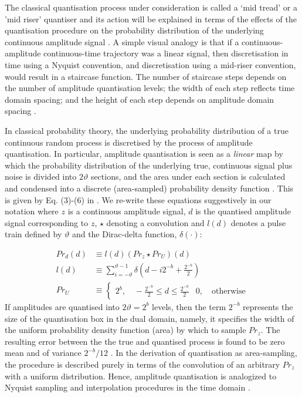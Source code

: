 The classical quantisation process under consideration is called a `mid tread' or a 'mid riser' quantiser and its action will be explained in terms of the effects of the quantisation procedure on the probability distribution of the underlying continuous amplitude signal \cite{widrow1996,karlsson2005}. A simple visual analogy is that if a continuous-amplitude continuous-time trajectory was a linear signal, then discretisation in time using a Nyquist convention, and discretisation using a mid-riser convention, would result in a staircase function. The number of staircase steps depends on the number of amplitude quantisation levels; the width of each step reflects time domain spacing; and the height of each step depends on amplitude domain spacing \cite{karlsson2005}.

In classical probability theory, the underlying probability distribution of a true continuous random process is discretised by the process of amplitude quantisation. In particular, amplitude quantisation is seen as a \emph{linear} map by which the probability distribution of the underlying true, continuous signal plus noise is divided into $2\vartheta$ sections, and the area under each section is calculated and condensed into a discrete (area-sampled) probability density function \cite{widrow1996,karlsson2005}.  This is given by Eq. (3)-(6) in \cite{karlsson2005}. We re-write these equations suggestively in our notation where $z$ is a continuous amplitude signal, $d$ is the quantised amplitude signal corresponding to $z$, $\star$ denoting a convolution and $l(d)$ denotes a pulse train defined by $\vartheta$ and the Dirac-delta function, $\delta(\cdot)$:

\begin{align}
Pr_d(d) & \equiv l(d) (Pr_z \star Pr_U)(d)  \label{eqn:app:classical_amp_quan_1}\\
l(d) & \equiv \sum_{i = -\vartheta}^{\vartheta-1} \delta (d - i2^{-b} +  \frac{2^{-b}}{2} ) \\
Pr_U & \equiv \begin{cases} 2^b, \quad -\frac{2^{-b}}{2} \leq d \leq  \frac{2^{-b}}{2} & 0, \quad \text{otherwise} \end{cases}
\end{align}
If amplitudes are quantised into $2\vartheta= 2^b$ levels, then the term $2^{-b}$ represents the size of the quantisation box in the dual domain, namely, it specifies the width of the uniform probability density function (area) by which to sample $Pr_z$.  The resulting error between the the true and quantised process is found to be zero mean and of variance $2^{-b} / 12$ \cite{widrow1996}. In the derivation of quantisation as area-sampling, the procedure is described purely in terms of the convolution of an arbitrary $Pr_z$ with a uniform distribution. Hence, amplitude quantisation is analogized to Nyquist sampling and interpolation procedures in the time domain \cite{widrow1996}. 


